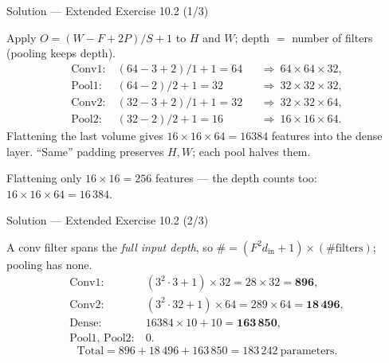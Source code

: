 \documentclass[aspectratio=169,11pt]{beamer}
\begin{document}
\begin{frame}{Solution --- Extended Exercise 10.2 (1/3)}
\begin{solutionbox}
  Apply $O=(W-F+2P)/S+1$ to $H$ and $W$; depth $=$ number of filters (pooling keeps
  depth).
  \[
    \begin{aligned}
      \text{Conv1}:&\ (64-3+2)/1+1=64 &&\Rightarrow\ 64\times64\times32,\\
      \text{Pool1}:&\ (64-2)/2+1=32   &&\Rightarrow\ 32\times32\times32,\\
      \text{Conv2}:&\ (32-3+2)/1+1=32 &&\Rightarrow\ 32\times32\times64,\\
      \text{Pool2}:&\ (32-2)/2+1=16   &&\Rightarrow\ 16\times16\times64.
    \end{aligned}
  \]
  Flattening the last volume gives $16\times16\times64=16384$ features into the dense
  layer. ``Same'' padding preserves $H,W$; each pool halves them.

\end{solutionbox}
\begin{mistake}
  Flattening only $16\times16=256$ features --- the depth counts too:
  $16\times16\times64=16\,384$.
\end{mistake}
\end{frame}

\begin{frame}{Solution --- Extended Exercise 10.2 (2/3)}
\begin{solutionbox}
  A conv filter spans the \emph{full input depth}, so
  $\#=(F^2 d_{\text{in}}+1)\times(\text{\#filters})$; pooling has none.
  \[
    \begin{aligned}
      \text{Conv1}:&\ (3^2\cdot3+1)\times32=28\times32=\mathbf{896},\\
      \text{Conv2}:&\ (3^2\cdot32+1)\times64=289\times64=\mathbf{18\,496},\\
      \text{Dense}:&\ 16384\times10+10=\mathbf{163\,850},\\
      \text{Pool1, Pool2}:&\ 0 .
    \end{aligned}
  \]
  \[
    \text{Total}=896+18\,496+163\,850=\boxed{183\,242}\ \text{parameters.}
  \]
\end{solutionbox}
\end{frame}
\end{document}
